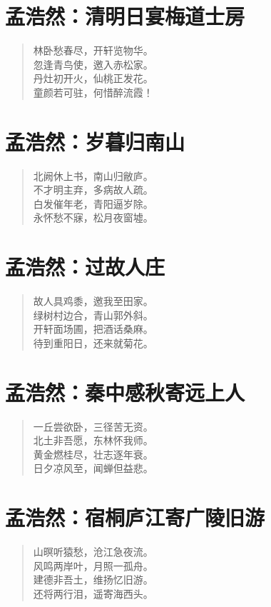 \documentclass[12pt,oneside]{book}
\newenvironment{shici}{
\begin{verse}
\centering\large\hspace{12pt}}
{\end{verse}}
\begin{document}
\chapter{孟浩然：清明日宴梅道士房}
\begin{shici}
林卧愁春尽，开轩览物华。\\
忽逢青鸟使，邀入赤松家。\\
丹灶初开火，仙桃正发花。\\
童颜若可驻，何惜醉流霞！
\end{shici}

\chapter{孟浩然：岁暮归南山}
\begin{shici}
北阙休上书，南山归敝庐。\\
不才明主弃，多病故人疏。\\
白发催年老，青阳逼岁除。\\
永怀愁不寐，松月夜窗墟。
\end{shici}

\chapter{孟浩然：过故人庄}
\begin{shici}
故人具鸡黍，邀我至田家。\\
绿树村边合，青山郭外斜。\\
开轩面场圃，把酒话桑麻。\\
待到重阳日，还来就菊花。
\end{shici}

\chapter{孟浩然：秦中感秋寄远上人}
\begin{shici}
一丘尝欲卧，三径苦无资。\\
北土非吾愿，东林怀我师。\\
黄金燃桂尽，壮志逐年衰。\\
日夕凉风至，闻蝉但益悲。
\end{shici}

\chapter{孟浩然：宿桐庐江寄广陵旧游}
\begin{shici}
山暝听猿愁，沧江急夜流。\\
风鸣两岸叶，月照一孤舟。\\
建德非吾土，维扬忆旧游。\\
还将两行泪，遥寄海西头。
\end{shici}
\end{document}
